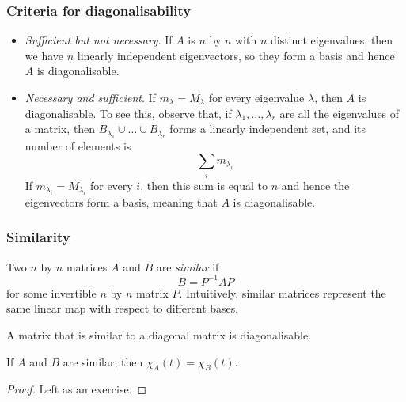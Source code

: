 \documentclass{../../template/note}
\begin{document}
    \subsubsection{Criteria for diagonalisability}

    \begin{itemize}
        \item \emph{Sufficient but not necessary}. If \(A\) is \(n\) by \(n\) with \(n\) distinct eigenvalues, then we have \(n\) linearly independent eigenvectors, so they form a basis and hence \(A\) is diagonalisable.
        \item \emph{Necessary and sufficient}. If \(m_\lambda = M_\lambda\) for every eigenvalue \(\lambda\), then \(A\) is diagonalisable. To see this, observe that, if \(\lambda_1, \dots, \lambda_r\) are all the eigenvalues of a matrix, then \(B_{\lambda_1} \cup \dots \cup B_{\lambda_r}\) forms a linearly independent set, and its number of elements is
        \[
            \sum_{i} m_{\lambda_i}
        \]
        If \(m_{\lambda_i} = M_{\lambda_i}\) for every \(i\), then this sum is equal to \(n\) and hence the eigenvectors form a basis, meaning that \(A\) is diagonalisable.
    \end{itemize}
    
    \subsubsection{Similarity}

    \begin{definition}
        Two \(n\) by \(n\) matrices \(A\) and \(B\) are \emph{similar} if
        \[
            B = P^{-1}AP
        \]
        for some invertible \(n\) by \(n\) matrix \(P\). Intuitively, similar matrices represent the same linear map with respect to different bases.
    \end{definition}

    \begin{remark}
        A matrix that is similar to a diagonal matrix is diagonalisable.
    \end{remark}
    
    \begin{proposition}
        If \(A\) and \(B\) are similar, then \(\chi_A(t) = \chi_B(t)\). 
    \end{proposition}

    \begin{proof}
        Left as an exercise.
    \end{proof}
    
\end{document}
